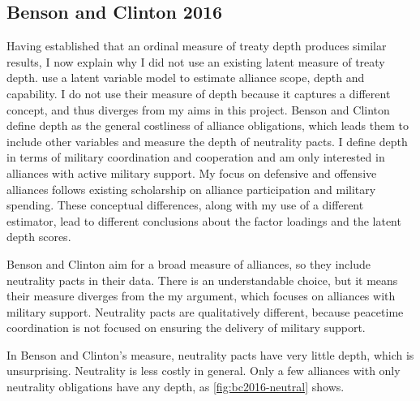 \documentclass[12pt]{article}
\begin{document}
\subsection{Benson and Clinton 2016}

Having established that an ordinal measure of treaty depth produces similar results, I now explain why I did not use an existing latent measure of treaty depth. 
\citet{BensonClinton2016} use a latent variable model to estimate alliance scope, depth and capability. 
I do not use their measure of depth because it captures a different concept, and thus diverges from my aims in this project. 
Benson and Clinton define depth as the general costliness of alliance obligations, which leads them to include other variables and measure the depth of neutrality pacts. 
I define depth in terms of military coordination and cooperation and am only interested in alliances with active military support. 
My focus on defensive and offensive alliances follows existing scholarship on alliance participation and military spending.
These conceptual differences, along with my use of a different estimator, lead to different conclusions about the factor loadings and the latent depth scores.


Benson and Clinton aim for a broad measure of alliances, so they include neutrality pacts in their data. 
There is an understandable choice, but it means their measure diverges from the my argument, which focuses on alliances with military support. 
Neutrality pacts are qualitatively different, because peacetime coordination is not focused on ensuring the delivery of military support. 


In Benson and Clinton's measure, neutrality pacts have very little depth, which is unsurprising.
Neutrality is less costly in general.  
Only a few alliances with only neutrality obligations have any depth, as \autoref{fig:bc2016-neutral} shows.  
\end{document}
